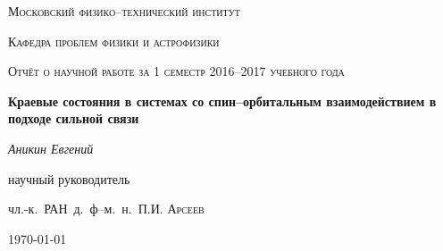 \begin{titlepage}
	\centering
	{\scshape\LARGE Московский физико--технический институт\par}
	{\scshape Кафедра проблем физики и астрофизики \par}
	\vspace{1cm}
	{\scshape\Large Отчёт о научной работе за 1 семестр 2016--2017 учебного года\par}
	\vspace{1.5cm}
	{\huge\bfseries Краевые состояния в системах со спин--орбитальным взаимодействием
		в подходе сильной связи\par}
	\vspace{2cm}
	{\Large\itshape Аникин Евгений\par}
	\vfill
	научный руководитель\par
	чл.-к.~РАН~д.~ф--м.~н.~П.И. \textsc{Арсеев}

	\vfill

	{\large \today\par}
\end{titlepage}
